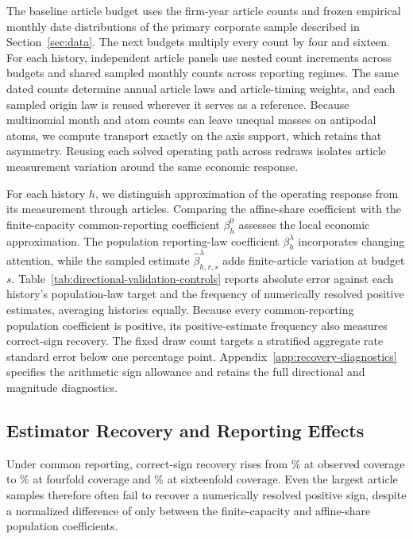 The baseline article budget uses the firm-year article counts and frozen
empirical monthly date distributions of the primary corporate sample
described in Section~\ref{sec:data}.
The next budgets multiply every count by four and sixteen.
For each history,  independent article panels
use nested count increments
across budgets and shared sampled monthly counts across reporting regimes.
The same dated counts determine annual article laws and article-timing
weights, and each sampled origin law is reused wherever it serves as a
reference.
Because multinomial month and atom counts can leave unequal masses on antipodal
atoms, we compute transport exactly on the axis support, which retains that
asymmetry.
Reusing each solved operating path across redraws isolates article
measurement variation around the same economic response.

For each history $h$, we distinguish approximation of the operating response
from its measurement through articles.
Comparing the affine-share coefficient with the finite-capacity
common-reporting coefficient $\beta_h^0$ assesses the local economic
approximation.
The population reporting-law coefficient $\beta_h^\lambda$ incorporates
changing attention, while the sampled estimate
$\widehat\beta_{h,r,s}^\lambda$ adds finite-article variation at budget $s$.
Table~\ref{tab:directional-validation-controls} reports absolute error
against each history's population-law target and the frequency of numerically
resolved positive estimates, averaging histories equally.
Because every common-reporting population coefficient is positive, its
positive-estimate frequency also measures correct-sign recovery.
The fixed draw count targets a stratified aggregate rate standard error below
one percentage point.
Appendix~\ref{app:recovery-diagnostics} specifies the arithmetic sign allowance
and retains the full directional and magnitude diagnostics.

\subsection{Estimator Recovery and Reporting Effects}\label{sec:simulation-recovery}



Under common reporting, correct-sign recovery rises from
\% at observed coverage to
\% at fourfold coverage and
\% at sixteenfold coverage.
Even the largest article samples therefore often fail to recover a
numerically resolved positive sign, despite a normalized difference of only
 between the finite-capacity and affine-share
population coefficients.

